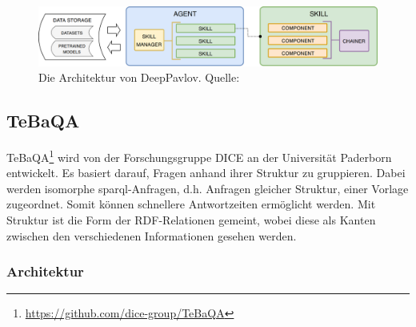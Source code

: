 \begin{figure}[htbp!]
\centering
\includegraphics[width=\textwidth, height=\textheight, keepaspectratio]{Images/DeepPavlovArchitecture.png}
\caption[DeepPavlov Architektur]{Die Architektur von DeepPavlov. Quelle: \citet{deeppavlov}}
\label{fig:deeppavlov-architektur}
\end{figure}

\subsection{TeBaQA}

TeBaQA\footnote{\url{https://github.com/dice-group/TeBaQA}} \citep{tebaqa} wird von der Forschungsgruppe DICE an der Universität Paderborn entwickelt.
Es basiert darauf, Fragen anhand ihrer Struktur zu gruppieren.
Dabei werden isomorphe \ac{sparql}-Anfragen, d.h. Anfragen gleicher Struktur, einer Vorlage zugeordnet.
Somit können schnellere Antwortzeiten ermöglicht werden.
Mit Struktur ist die Form der RDF-Relationen gemeint, wobei diese als Kanten zwischen den verschiedenen Informationen gesehen werden.

\subsubsection{Architektur}


